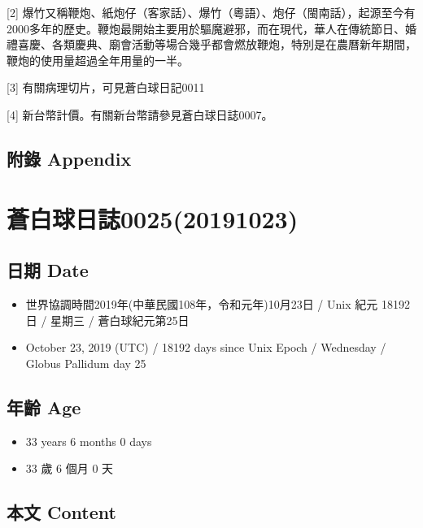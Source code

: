 \documentclass[a5paper, 12pt
]{book}
\providecommand{\tightlist}{%
  \setlength{\itemsep}{0pt}\setlength{\parskip}{0pt}}
\begin{document}
{[}2{]}
爆竹又稱鞭炮、紙炮仔（客家話）、爆竹（粵語）、炮仔（閩南話），起源至今有2000多年的歷史。鞭炮最開始主要用於驅魔避邪，而在現代，華人在傳統節日、婚禮喜慶、各類慶典、廟會活動等場合幾乎都會燃放鞭炮，特別是在農曆新年期間，鞭炮的使用量超過全年用量的一半。

{[}3{]} 有關病理切片，可見蒼白球日記0011

{[}4{]} 新台幣計價。有關新台幣請參見蒼白球日誌0007。

\hypertarget{ux9644ux9304-appendix-16}{%
\subsection{附錄 Appendix}\label{ux9644ux9304-appendix-16}}

\hypertarget{ux84bcux767dux7403ux65e5ux8a8c002520191023}{%
\section{蒼白球日誌0025(20191023)}\label{ux84bcux767dux7403ux65e5ux8a8c002520191023}}

\hypertarget{ux65e5ux671f-date-22}{%
\subsection{日期 Date}\label{ux65e5ux671f-date-22}}

\begin{itemize}
\tightlist
\item
  世界協調時間2019年(中華民國108年，令和元年)10月23日 / Unix 紀元 18192
  日 / 星期三 / 蒼白球紀元第25日
\item
  October 23, 2019 (UTC) / 18192 days since Unix Epoch / Wednesday /
  Globus Pallidum day 25
\end{itemize}

\hypertarget{ux5e74ux9f61-age-22}{%
\subsection{年齡 Age}\label{ux5e74ux9f61-age-22}}

\begin{itemize}
\tightlist
\item
  33 years 6 months 0 days
\item
  33 歲 6 個月 0 天
\end{itemize}

\hypertarget{ux672cux6587-content-22}{%
\subsection{本文 Content}\label{ux672cux6587-content-22}}
\end{document}
